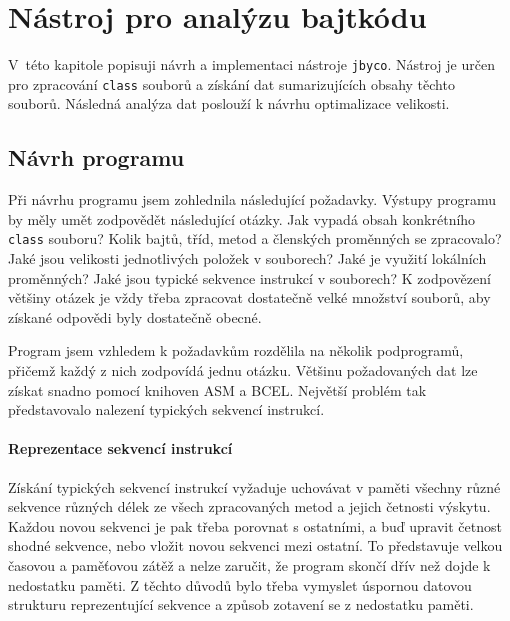\chapter{Nástroj pro analýzu bajtkódu}\label{Tool}



V~této kapitole popisuji návrh a implementaci nástroje \texttt{jbyco}. Nástroj je určen pro zpracování \texttt{class} souborů a získání dat sumarizujících obsahy těchto souborů. Následná analýza dat poslouží k návrhu optimalizace velikosti.

\section{Návrh programu}\label{ToolDesign}

Při návrhu programu jsem zohlednila následující požadavky. 
Výstupy programu by měly umět zodpovědět následující otázky. Jak vypadá obsah konkrétního \texttt{class} souboru? Kolik bajtů, tříd, metod a členských proměnných se zpracovalo? Jaké jsou velikosti jednotlivých položek v souborech? Jaké je využití lokálních proměnných? Jaké jsou typické sekvence instrukcí v souborech? K zodpovězení většiny otázek je vždy třeba zpracovat dostatečně velké množství souborů, aby získané odpovědi byly dostatečně obecné. 

Program jsem vzhledem k požadavkům rozdělila na několik podprogramů, přičemž každý z nich zodpovídá jednu otázku. 
Většinu požadovaných dat lze získat snadno pomocí knihoven ASM a BCEL. Největší problém tak představovalo nalezení typických sekvencí instrukcí.

\subsubsection{Reprezentace sekvencí instrukcí}

Získání typických sekvencí instrukcí vyžaduje uchovávat v paměti všechny různé sekvence různých délek ze všech zpracovaných metod a jejich četnosti výskytu. Každou novou sekvenci je pak třeba porovnat s ostatními, a buď upravit četnost shodné sekvence, nebo vložit novou sekvenci mezi ostatní. To představuje velkou časovou a paměťovou zátěž a nelze zaručit, že program skončí dřív než dojde k nedostatku paměti. Z těchto důvodů bylo třeba vymyslet úspornou datovou strukturu reprezentující sekvence a způsob zotavení se z nedostatku paměti.


